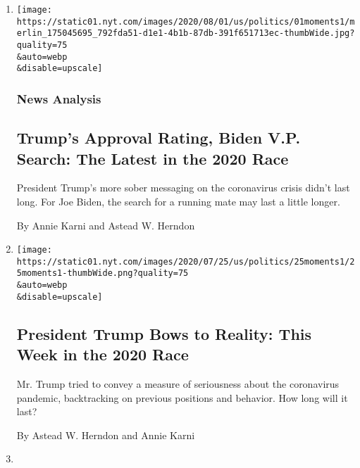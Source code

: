\begin{enumerate}
\def\labelenumi{\arabic{enumi}.}
\item
  \href{/2020/08/01/us/politics/trump-biden-polls-vp.html}{}

  \texttt{[image: https://static01.nyt.com/images/2020/08/01/us/politics/01moments1/merlin\_175045695\_792fda51-d1e1-4b1b-87db-391f651713ec-thumbWide.jpg?quality=75\\\&auto=webp\\\&disable=upscale]}

  \hypertarget{news-analysis}{%
  \subsubsection{News Analysis}\label{news-analysis}}

  \hypertarget{trumps-approval-rating-biden-vp-search-the-latest-in-the-2020-race}{%
  \subsection{Trump's Approval Rating, Biden V.P. Search: The Latest in
  the 2020
  Race}\label{trumps-approval-rating-biden-vp-search-the-latest-in-the-2020-race}}

  President Trump's more sober messaging on the coronavirus crisis
  didn't last long. For Joe Biden, the search for a running mate may
  last a little longer.

  By Annie Karni and Astead W. Herndon
\item
  \href{/2020/07/25/us/politics/trump-biden-polls-coronavirus.html}{}

  \texttt{[image: https://static01.nyt.com/images/2020/07/25/us/politics/25moments1/25moments1-thumbWide.png?quality=75\\\&auto=webp\\\&disable=upscale]}

  \hypertarget{president-trump-bows-to-reality-this-week-in-the-2020-race}{%
  \subsection{President Trump Bows to Reality: This Week in the 2020
  Race}\label{president-trump-bows-to-reality-this-week-in-the-2020-race}}

  Mr. Trump tried to convey a measure of seriousness about the
  coronavirus pandemic, backtracking on previous positions and behavior.
  How long will it last?

  By Astead W. Herndon and Annie Karni
\item
  \href{/2020/07/23/us/politics/barack-obama-joe-biden-video.html}{}


\end{enumerate}
